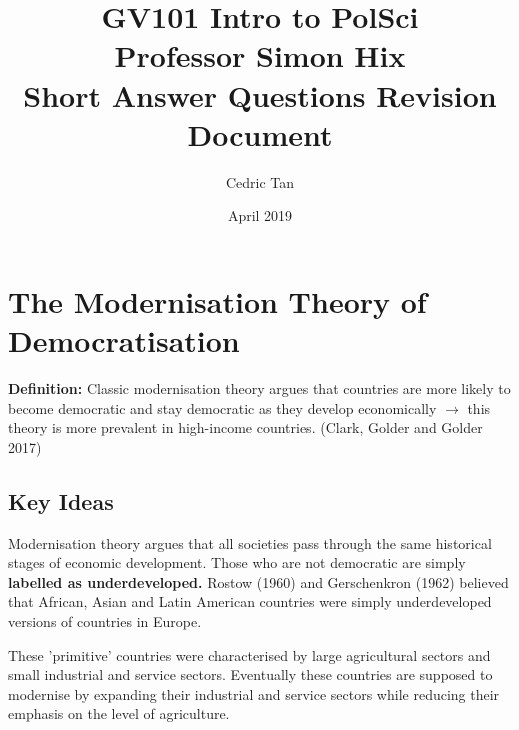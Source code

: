 \documentclass[12pt, letterpaper]{article}
\title{
	GV101 Intro to PolSci\\
	\large{Professor Simon Hix}\\
	\large{Short Answer Questions Revision Document}
}
\author{Cedric Tan}
\date{April 2019}
\begin{document}
\maketitle
{}

\newpage
\tableofcontents
\newpage


\section{The Modernisation Theory of Democratisation}

\textbf{Definition:} Classic modernisation theory argues that countries are more likely to become democratic and stay democratic as they develop economically $\rightarrow$ this theory is more prevalent in high-income countries. (Clark, Golder and Golder 2017)

\subsection{Key Ideas}
Modernisation theory argues that all societies pass through the same historical stages of economic development. Those who are not democratic are simply \textbf{labelled as underdeveloped.} Rostow (1960) and Gerschenkron (1962) believed that African, Asian and Latin American countries were simply underdeveloped versions of countries in Europe.

These 'primitive' countries were characterised by large agricultural sectors and small industrial and service sectors. Eventually these countries are supposed to modernise by expanding their industrial and service sectors while reducing their emphasis on the level of agriculture.
\end{document}
